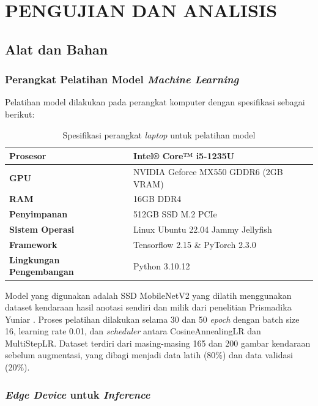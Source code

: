 \chapter{PENGUJIAN DAN ANALISIS}
\label{chap:pengujiananalisis}

\section{Alat dan Bahan}
\label{sec:alatdanbahan}

\subsection{Perangkat Pelatihan Model \emph{Machine Learning}}

Pelatihan model dilakukan pada perangkat komputer dengan spesifikasi sebagai berikut:

\begin{table}[htbp]
  \centering
  \caption{Spesifikasi perangkat \emph{laptop} untuk pelatihan model}
  \label{tab:training_laptop_specs}
  \begin{tabular}{|l|l|}
  \hline
  \textbf{Prosesor} & Intel® Core™ i5-1235U \\
  \hline
  \textbf{GPU} & NVIDIA Geforce MX550 GDDR6 (2GB VRAM) \\
  \hline
  \textbf{RAM} & 16GB DDR4 \\
  \hline
  \textbf{Penyimpanan} & 512GB SSD M.2 PCIe \\
  \hline
  \textbf{Sistem Operasi} & Linux Ubuntu 22.04 Jammy Jellyfish \\
  \hline
  \textbf{Framework} & Tensorflow 2.15 \& PyTorch 2.3.0 \\
  \hline
  \textbf{Lingkungan Pengembangan} & Python 3.10.12 \\
  \hline
  \end{tabular}
\end{table}
Model yang digunakan adalah SSD MobileNetV2 yang dilatih menggunakan dataset kendaraan hasil anotasi sendiri dan milik dari penelitian Prismadika Yuniar \parencite*{prismadika2023}. Proses pelatihan dilakukan selama 30 dan 50 \emph{epoch} dengan batch size 16, learning rate 0.01, dan \emph{scheduler} antara CosineAnnealingLR dan MultiStepLR. Dataset terdiri dari masing-masing 165 dan 200 gambar kendaraan sebelum augmentasi, yang dibagi menjadi data latih (80\%) dan data validasi (20\%).

\subsection{\emph{Edge Device} untuk \emph{Inference}}

